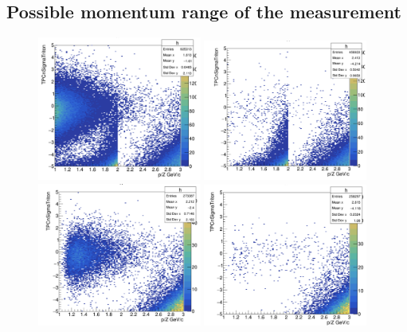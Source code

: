 \subsection{Possible momentum range of the measurement}
\begin{figure}
    \centering
    \includegraphics[width=0.48\textwidth]{figures/triton/tbar_TPCnSigma_noTOF_noDCA.png}
    \includegraphics[width=0.48\textwidth]{figures/triton/tbar_TPCnSigma_noTOFcut.png}
    \includegraphics[width=0.48\textwidth]{figures/triton/tbar_TPCnSigma_TOF_cit_noDCA_cut.png}
    \includegraphics[width=0.48\textwidth]{figures/triton/tbar_TPCnSigma_TOF_cut_and_DCA_cut.png}

\end{figure}
